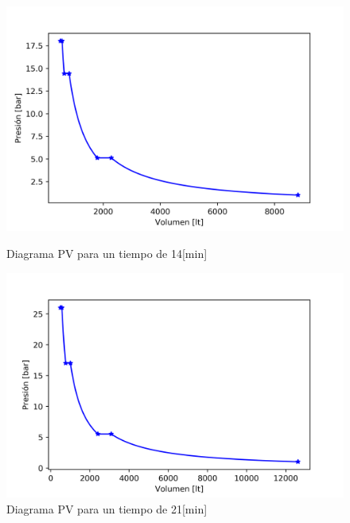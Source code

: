 \documentclass[11pt,letterpaper]{extarticle}        %
\numberwithin{equation}{section}                    %
\begin{document}
\begin{figure}[H]
\centering
\begin{minipage}{0.49\linewidth}
\centering
\includegraphics[width = \linewidth]{tiempo14}
\caption{Diagrama PV para un tiempo de 14[min]}
\label{f:t14}
\end{minipage}
\hfill
\begin{minipage}{0.49\linewidth}
\centering
\includegraphics[width = \linewidth]{tiempo21}
\caption{Diagrama PV para un tiempo de 21[min]}
\label{f:t21}
\end{minipage}
\end{figure}
\end{document}
